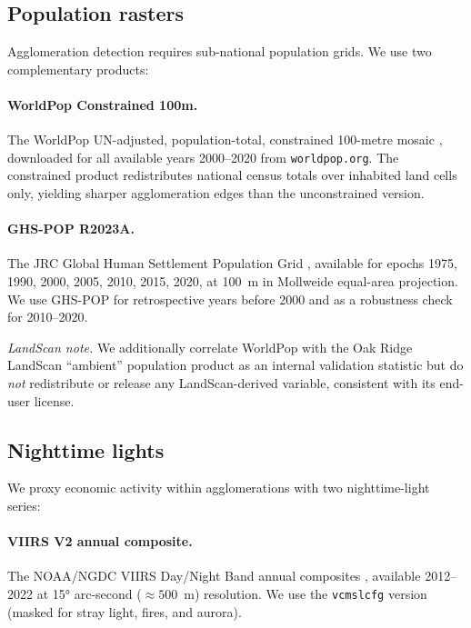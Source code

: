 \documentclass[11pt, a4paper]{article}
\begin{document}
\subsection{Population rasters}
\label{sec:data:pop}

Agglomeration detection requires sub-national population grids. We use two
complementary products:

\paragraph{WorldPop Constrained 100m.}
The WorldPop UN-adjusted, population-total, constrained 100-metre mosaic
\citep{stevens_gaughan_linard_tatem_2015}, downloaded for all available years
2000--2020 from \texttt{worldpop.org}.  The constrained product redistributes
national census totals over inhabited land cells only, yielding sharper
agglomeration edges than the unconstrained version.

\paragraph{GHS-POP R2023A.}
The JRC Global Human Settlement Population Grid
\citep{florczyk_corbane_ehrlich_freire_kemper_maffenini_melchiorri_pesaresi_politis_schiavina_zanchetta_2019},
available for epochs 1975, 1990, 2000, 2005, 2010, 2015, 2020, at 100~m in
Mollweide equal-area projection.  We use GHS-POP for retrospective years
before 2000 and as a robustness check for 2010--2020.

\noindent\emph{LandScan note.} We additionally correlate WorldPop with the
Oak Ridge LandScan ``ambient'' population product as an internal validation
statistic but do \emph{not} redistribute or release any LandScan-derived
variable, consistent with its end-user license.

\subsection{Nighttime lights}
\label{sec:data:ntl}

We proxy economic activity within agglomerations with two nighttime-light
series:

\paragraph{VIIRS V2 annual composite.}
The NOAA/NGDC VIIRS Day/Night Band annual composites
\citep{elvidge_zhizhin_ghosh_baugh_hsu_2021}, available 2012--2022 at
\ang{15} arc-second (${\approx}500$~m) resolution. We use the
\texttt{vcmslcfg} version (masked for stray light, fires, and aurora).
\end{document}
